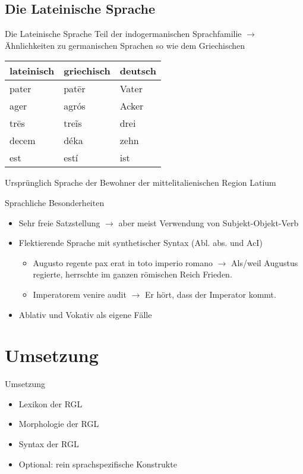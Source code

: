\documentclass{beamer}
\begin{document}
\subsection{Die Lateinische Sprache}
\begin{frame}[fragile]{Die Lateinische Sprache}
Teil der indogermanischen Sprachfamilie $\rightarrow$ Ähnlichkeiten zu germanischen Sprachen so wie dem Griechischen \\
\begin{center}
\begin{tabular}{|l|l|l|}
  \hline
  lateinisch & griechisch & deutsch \\
  \hline
  pater & patēr & Vater \\
  ager & agrós & Acker \\
  trēs & treĩs & drei \\
  decem & déka & zehn \\
  est & estí & ist \\
  \hline
\end{tabular}
\end{center}
Ursprünglich Sprache der Bewohner der mittelitalienischen Region Latium
\end{frame}
\begin{frame}{Sprachliche Besonderheiten}
\begin{itemize}
  \item Sehr freie Satzstellung $\rightarrow$ aber meist Verwendung von Subjekt-Objekt-Verb
  \item Flektierende Sprache mit synthetischer Syntax (Abl. abs. und AcI)
    \begin{itemize}
      \item Augusto regente pax erat in toto imperio romano $\rightarrow$ Als/weil Augustus regierte, herrschte im ganzen römischen Reich Frieden.
      \item Imperatorem venire audit $\rightarrow$ Er hört, dass der Imperator kommt.
    \end{itemize}
  \item Ablativ und Vokativ als eigene Fälle
\end{itemize}
\end{frame}
\section{Umsetzung}
\begin{frame}{Umsetzung}
\begin{itemize}
  \item Lexikon der RGL
  \item Morphologie der RGL
  \item Syntax der RGL
  \item Optional: rein sprachspezifische Konstrukte
\end{itemize}
\end{frame}
\end{document}
